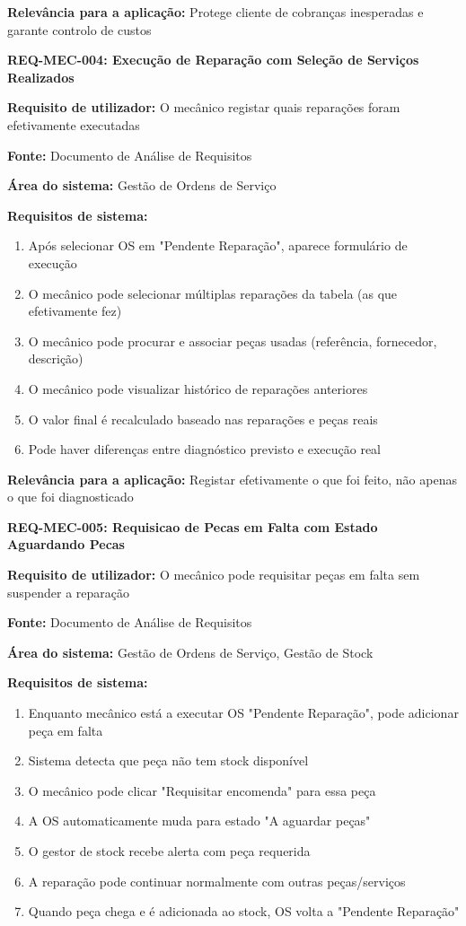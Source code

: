 \documentclass[11pt,a4paper]{article}
\newcommand{\reqheader}[1]{{\noindent\large\bfseries\color{sectionblue}#1}\par\vspace{0.3cm}}
\newcommand{\reqfield}[2]{{\noindent\textbf{#1:} #2}\par\vspace{0.2cm}}
\begin{document}
\reqfield{Relevância para a aplicação}{Protege cliente de cobranças inesperadas e garante controlo de custos}

\vspace{0.8cm}

\reqheader{REQ-MEC-004: Execução de Reparação com Seleção de Serviços Realizados}

\reqfield{Requisito de utilizador}{O mecânico registar quais reparações foram efetivamente executadas}

\reqfield{Fonte}{Documento de Análise de Requisitos}

\reqfield{Área do sistema}{Gestão de Ordens de Serviço}

\reqfield{Requisitos de sistema}{
	\begin{enumerate}
		\item Após selecionar OS em "Pendente Reparação", aparece formulário de execução
		\item O mecânico pode selecionar múltiplas reparações da tabela (as que efetivamente fez)
		\item O mecânico pode procurar e associar peças usadas (referência, fornecedor, descrição)
		\item O mecânico pode visualizar histórico de reparações anteriores
		\item O valor final é recalculado baseado nas reparações e peças reais
		\item Pode haver diferenças entre diagnóstico previsto e execução real
	\end{enumerate}
}

\reqfield{Relevância para a aplicação}{Registar efetivamente o que foi feito, não apenas o que foi diagnosticado}

\vspace{0.8cm}

\reqheader{REQ-MEC-005: Requisicao de Pecas em Falta com Estado Aguardando Pecas}

\reqfield{Requisito de utilizador}{O mecânico pode requisitar peças em falta sem suspender a reparação}

\reqfield{Fonte}{Documento de Análise de Requisitos}

\reqfield{Área do sistema}{Gestão de Ordens de Serviço, Gestão de Stock}

\reqfield{Requisitos de sistema}{
	\begin{enumerate}
		\item Enquanto mecânico está a executar OS "Pendente Reparação", pode adicionar peça em falta
		\item Sistema detecta que peça não tem stock disponível
		\item O mecânico pode clicar "Requisitar encomenda" para essa peça
		\item A OS automaticamente muda para estado "A aguardar peças"
		\item O gestor de stock recebe alerta com peça requerida
		\item A reparação pode continuar normalmente com outras peças/serviços
		\item Quando peça chega e é adicionada ao stock, OS volta a "Pendente Reparação"
	\end{enumerate}
}
\end{document}
